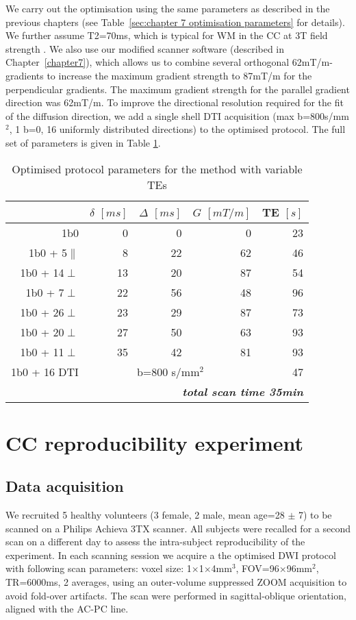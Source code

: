 We carry out the optimisation using the same parameters as described in the previous chapters (see Table~\ref{sec:chapter 7 optimisation parameters} for details). We further assume T2=70ms, which is typical for \gls{WM} in the \gls{CC} at 3T field strength \citep{Stanisz:2005}. We also use our modified scanner software (described in Chapter~\ref{chapter7}), which allows us to combine several orthogonal 62mT/m-gradients to increase the maximum gradient strength to 87mT/m for the perpendicular gradients. The maximum gradient strength for the parallel gradient direction was 62mT/m. To improve the directional resolution required for the fit of the diffusion direction, we add a single shell DTI acquisition (max b=800s/mm$^2$, 1 b=0, 16 uniformly distributed directions) to the optimised protocol. The full set of parameters is given in Table \ref{tab:chap9 protocol table}.

\begin{table}[htbp]
  \centering
  \caption{Optimised protocol parameters for the \SFasym{} method with variable TEs}
    \begin{tabular}{rrrrr}
    \toprule
    	  & $\delta$ $[ms]$   & $\Delta$ $[ms]$ & $G$ $[mT/m]$ & TE $[s]$\\
    \midrule
    {1b0} & {0} & {0} & {0} & {23} \\
    {1b0 + 5$\parallel$} & {8} & {22} & {62} & {46} \\
    {1b0 + 14$\perp$} & {13} & {20} & {87} & {54} \\
    {1b0 + 7$\perp$} & {22} & {56} & {48} & {96} \\
    {1b0 + 26$\perp$} & {23} & {29} & {87} & {73} \\
    {1b0 + 20$\perp$} & {27} & {50} & {63} & {93} \\
    {1b0 + 11$\perp$} & {35} & {42} & {81} & {93} \\
    {1b0 + 16 DTI} & \multicolumn{3}{c}{{b=800 s/mm$^2$}} & {47} \\
    \midrule
    \multicolumn{5}{r}{\textit{\textbf{total scan time 35min}}} \\
    \bottomrule
    \end{tabular}%
  \label{tab:chap9 protocol table}%
\end{table}%

\section{CC reproducibility experiment}
\subsection{Data acquisition}
We recruited 5 healthy volunteers (3 female, 2 male, mean age=28 $\pm$ 7) to be scanned on a Philips Achieva 3TX scanner. All subjects were recalled for a second scan on a different day to assess the intra-subject reproducibility of the experiment. In each scanning session we acquire a the optimised DWI protocol with following scan parameters: voxel size: 1$\times$1$\times$4mm$^3$, FOV=96$\times$96mm$^2$, TR=6000ms, 2 averages, using an outer-volume suppressed ZOOM acquisition \citep{Wilm:2007} to avoid fold-over artifacts. The scan were performed in sagittal-oblique orientation, aligned with the AC-PC line.

